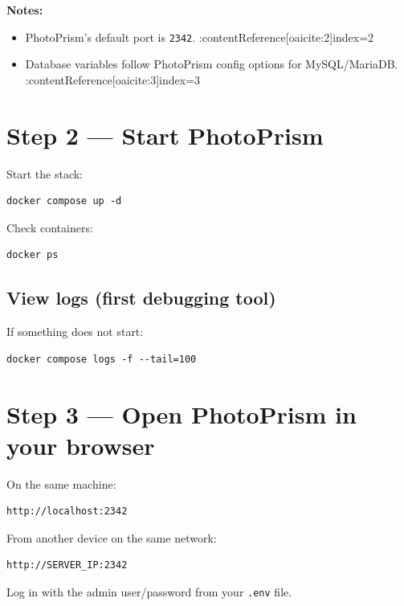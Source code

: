 \textbf{Notes:}
\begin{itemize}[leftmargin=*]
  \item PhotoPrism’s default port is \texttt{2342}. :contentReference[oaicite:2]{index=2}
  \item Database variables follow PhotoPrism config options for MySQL/MariaDB. :contentReference[oaicite:3]{index=3}
\end{itemize}


\section{Step 2 --- Start PhotoPrism}
Start the stack:

\begin{lstlisting}
docker compose up -d
\end{lstlisting}

Check containers:

\begin{lstlisting}
docker ps
\end{lstlisting}

\subsection{View logs (first debugging tool)}
If something does not start:

\begin{lstlisting}
docker compose logs -f --tail=100
\end{lstlisting}

\section{Step 3 --- Open PhotoPrism in your browser}
On the same machine:
\begin{lstlisting}
http://localhost:2342
\end{lstlisting}

From another device on the same network:
\begin{lstlisting}
http://SERVER_IP:2342
\end{lstlisting}

Log in with the admin user/password from your \texttt{.env} file.


